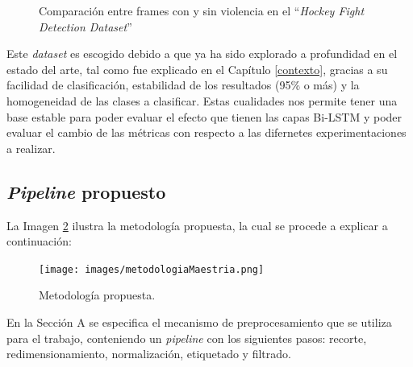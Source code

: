 \begin{figure}[h!]%
    \centering
    \qquad
    \caption{Comparación entre frames con y sin violencia en el ``\textit{Hockey Fight Detection Dataset}'' }%
    \label{fig:combinedHockey}%
\end{figure}

Este \textit{dataset} es escogido debido a que ya ha sido explorado 
a profundidad en el estado del arte, tal como fue explicado en 
el Capítulo \ref{contexto}, gracias a su facilidad de clasificación, 
estabilidad de los resultados (95\% o más) y la homogeneidad de las 
clases a clasificar. Estas cualidades nos permite tener una base 
estable para poder evaluar el efecto que tienen las capas Bi-LSTM y 
poder evaluar el cambio de las métricas con respecto a las difernetes 
experimentaciones a realizar.

\subsection{\textit{Pipeline} propuesto} \label{pipeline}

La Imagen \ref{metodologia} ilustra la metodología propuesta, 
la cual se procede a explicar a continuación:

\begin{figure}[h!] 
    \texttt{[image: images/metodologiaMaestria.png]} 
    \centering 
    \caption{Metodología propuesta.} 
    \label{metodologia} 
\end{figure}

En la Sección A se especifica el mecanismo de preprocesamiento 
que se utiliza para el trabajo, conteniendo un \textit{pipeline} con 
los siguientes pasos: recorte, redimensionamiento, normalización, 
etiquetado y filtrado.\\

